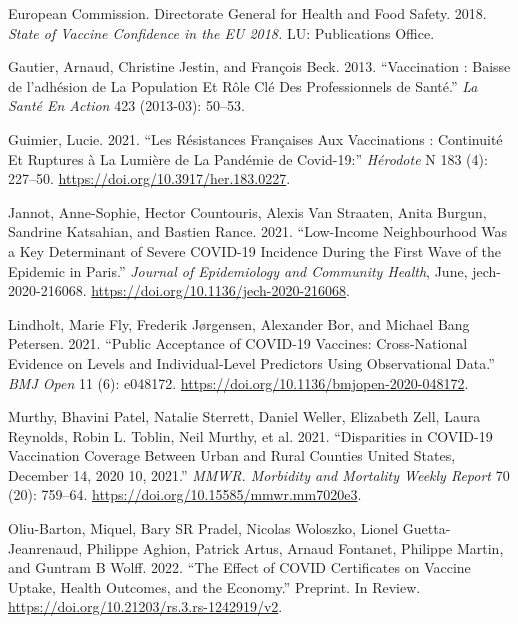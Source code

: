 \documentclass[
]{article}
\newlength{\cslhangindent}
\newlength{\cslentryspacingunit} %
\newenvironment{CSLReferences}[2] %
 {%
  \setlength{\parindent}{0pt}
  \ifodd #1
  \let\oldpar\par
  \def\par{\hangindent=\cslhangindent\oldpar}
  \fi
  \setlength{\parskip}{#2\cslentryspacingunit}
 }%
 {}
\begin{document}
\begin{CSLReferences}{1}{0}
\leavevmode{}%
European Commission. Directorate General for Health and Food Safety. 2018. \emph{State of Vaccine Confidence in the {EU} 2018.} {LU}: {Publications Office}.

\leavevmode{}%
Gautier, Arnaud, Christine Jestin, and François Beck. 2013. {``Vaccination : Baisse de l'adhésion de La Population Et Rôle Clé Des Professionnels de Santé.''} \emph{La Santé En Action} 423 (2013-03): 50--53.

\leavevmode{}%
Guimier, Lucie. 2021. {``Les Résistances Françaises Aux Vaccinations : Continuité Et Ruptures à La Lumière de La Pandémie de {Covid-19}:''} \emph{Hérodote} N\textdegree{} 183 (4): 227--50. \url{https://doi.org/10.3917/her.183.0227}.

\leavevmode{}%
Jannot, Anne-Sophie, Hector Countouris, Alexis Van Straaten, Anita Burgun, Sandrine Katsahian, and Bastien Rance. 2021. {``Low-Income Neighbourhood Was a Key Determinant of Severe {COVID-19} Incidence During the First Wave of the Epidemic in {Paris}.''} \emph{Journal of Epidemiology and Community Health}, June, jech-2020-216068. \url{https://doi.org/10.1136/jech-2020-216068}.

\leavevmode{}%
Lindholt, Marie Fly, Frederik Jørgensen, Alexander Bor, and Michael Bang Petersen. 2021. {``Public Acceptance of {COVID-19} Vaccines: Cross-National Evidence on Levels and Individual-Level Predictors Using Observational Data.''} \emph{BMJ Open} 11 (6): e048172. \url{https://doi.org/10.1136/bmjopen-2020-048172}.

\leavevmode{}%
Murthy, Bhavini Patel, Natalie Sterrett, Daniel Weller, Elizabeth Zell, Laura Reynolds, Robin L. Toblin, Neil Murthy, et al. 2021. {``Disparities in {COVID-19 Vaccination Coverage Between Urban} and {Rural Counties} \textemdash{} {United States}, {December} 14, 2020 10, 2021.''} \emph{MMWR. Morbidity and Mortality Weekly Report} 70 (20): 759--64. \url{https://doi.org/10.15585/mmwr.mm7020e3}.

\leavevmode{}%
Oliu-Barton, Miquel, Bary SR Pradel, Nicolas Woloszko, Lionel Guetta-Jeanrenaud, Philippe Aghion, Patrick Artus, Arnaud Fontanet, Philippe Martin, and Guntram B Wolff. 2022. {``The Effect of {COVID} Certificates on Vaccine Uptake, Health Outcomes, and the Economy.''} Preprint. {In Review}. \url{https://doi.org/10.21203/rs.3.rs-1242919/v2}.


\end{CSLReferences}
\end{document}
